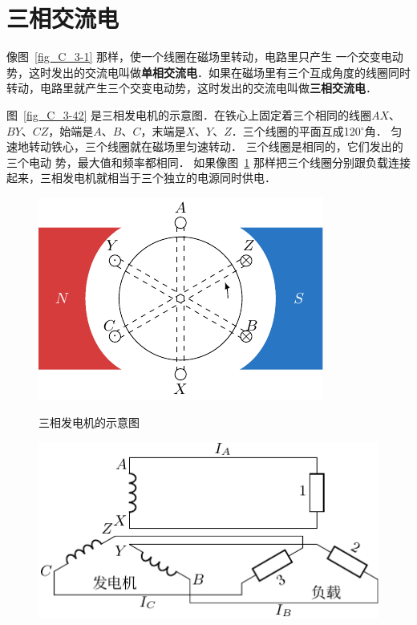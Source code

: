 	
\section{三相交流电}
像图~\ref{fig_C_3-1} 那样，使一个线圈在磁场里转动，电路里只产生
一个交变电动势，这时发出的交流电叫做\textbf{单相交流电}．如果在磁场里有三个互成角度的线圈同时转动，电路里就产生三个交变电动势，这时发出的交流电叫做\textbf{三相交流电}．


图~\ref{fig_C_3-42} 是三相发电机的示意图．在铁心上固定着三个相同的线圈$AX$、$BY$、$CZ$，始端是$A$、$B$、$C$，末端是$X$、$Y$、$Z$．三个线圈的平面互成120$^\circ$角．
匀速地转动铁心，三个线圈就在磁场里匀速转动．
三个线圈是相同的，它们发出的三个电动
势，最大值和频率都相同．
如果像图~\ref{fig_C_3-43} 那样把三个线圈分别跟负载连接起来，三相发电机就相当于三个独立的电源同时供电．

\begin{figure}[htbp]
	\centering
	\begin{minipage}[b]{0.48\linewidth}
		\centering
		\includegraphics{fig/C/3-42.pdf}
		\caption{三相发电机的示意图}\label{fig_C_3-42}
	\end{minipage}
	\begin{minipage}[b]{0.48\linewidth}
		\centering
		\includegraphics{fig/C/3-43.pdf}
		\caption{}\label{fig_C_3-43}
	\end{minipage}
\end{figure}


